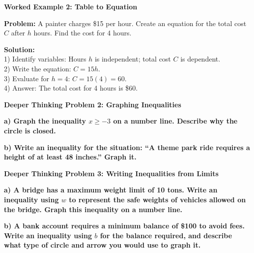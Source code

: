\documentclass[12pt, letterpaper, fleqn]{article}
\begin{document}
\begin{tcolorbox}[colback=white, colframe=black!25, boxrule=0.6pt, arc=4mm, left=6mm, right=6mm, top=5mm, bottom=5mm]
\textbf{Worked Example 2: Table to Equation}

\medskip
\noindent
\textbf{Problem:} A painter charges \$15 per hour. Create an equation for the total cost $C$ after $h$ hours. Find the cost for 4 hours.

\medskip
\noindent
\textbf{Solution:} \\
1) Identify variables: Hours $h$ is independent; total cost $C$ is dependent. \\
2) Write the equation: $C = 15h$. \\
3) Evaluate for $h = 4$: $C = 15(4) = 60$. \\
4) Answer: The total cost for 4 hours is \$60.
\end{tcolorbox}

\vspace{4mm}

\begin{tcolorbox}[colback=black!5, colframe=black!50, boxrule=1pt, arc=4mm, left=6mm, right=6mm, top=5mm, bottom=5mm]
\textbf{Deeper Thinking Problem 2: Graphing Inequalities}

\medskip

\noindent
\textbf{a) Graph the inequality $x \ge -3$ on a number line. Describe why the circle is closed.}

\vspace{2.5cm}

\noindent
\textbf{b) Write an inequality for the situation: ``A theme park ride requires a height of at least 48 inches.'' Graph it.}

\vspace{2cm}
\end{tcolorbox}
\newpage

\begin{tcolorbox}[colback=black!5, colframe=black!50, boxrule=1pt, arc=4mm, left=6mm, right=6mm, top=5mm, bottom=5mm]
\textbf{Deeper Thinking Problem 3: Writing Inequalities from Limits}

\medskip

\noindent
\textbf{a) A bridge has a maximum weight limit of 10 tons. Write an inequality using $w$ to represent the safe weights of vehicles allowed on the bridge. Graph this inequality on a number line.}

\vspace{2.5cm}

\noindent
\textbf{b) A bank account requires a minimum balance of \$100 to avoid fees. Write an inequality using $b$ for the balance required, and describe what type of circle and arrow you would use to graph it.}

\vspace{2.5cm}
\end{tcolorbox}
\newpage
\end{document}
